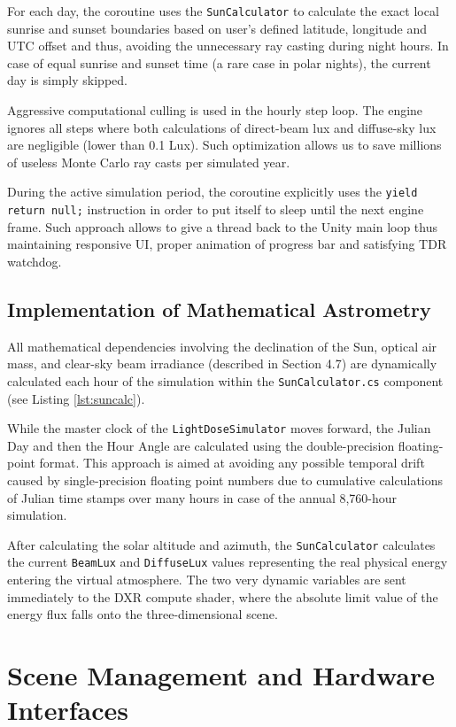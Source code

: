 For each day, the coroutine uses the \texttt{SunCalculator} to calculate the exact local sunrise and sunset boundaries based on user's defined latitude, longitude and UTC offset and thus, avoiding the unnecessary ray casting during night hours. In case of equal sunrise and sunset time (a rare case in polar nights), the current day is simply skipped.

Aggressive computational culling is used in the hourly step loop. The engine ignores all steps where both calculations of direct-beam lux and diffuse-sky lux are negligible (lower than 0.1 Lux). Such optimization allows us to save millions of useless Monte Carlo ray casts per simulated year.

During the active simulation period, the coroutine explicitly uses the \texttt{yield return null;} instruction in order to put itself to sleep until the next engine frame. Such approach allows to give a thread back to the Unity main loop thus maintaining responsive UI, proper animation of progress bar and satisfying TDR watchdog.

\subsection{Implementation of Mathematical Astrometry}
\label{sec:astrometry_implementation}

All mathematical dependencies involving the declination of the Sun, optical air mass, and clear-sky beam irradiance (described in Section 4.7) are dynamically calculated each hour of the simulation within the \texttt{SunCalculator.cs} component (see Listing \ref{lst:suncalc}).

While the master clock of the \texttt{LightDoseSimulator} moves forward, the Julian Day and then the Hour Angle are calculated using the double-precision floating-point format. This approach is aimed at avoiding any possible temporal drift caused by single-precision floating point numbers due to cumulative calculations of Julian time stamps over many hours in case of the annual 8,760-hour simulation.

After calculating the solar altitude and azimuth, the \texttt{SunCalculator} calculates the current \texttt{BeamLux} and \texttt{DiffuseLux} values representing the real physical energy entering the virtual atmosphere. The two very dynamic variables are sent immediately to the DXR compute shader, where the absolute limit value of the energy flux falls onto the three-dimensional scene.

\section{Scene Management and Hardware Interfaces}

